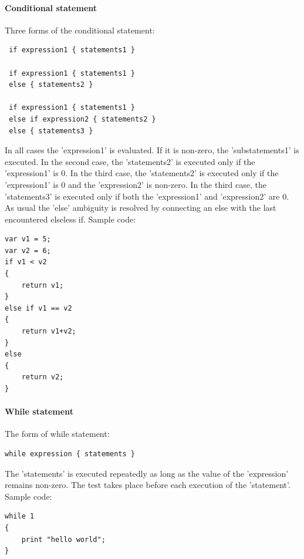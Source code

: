 \documentclass[12pt]{article} %
\begin{document}
\paragraph{Conditional statement}
Three forms of the conditional statement:
\begin{lstlisting}
 if expression1 { statements1 }

 if expression1 { statements1 } 
 else { statements2 }

 if expression1 { statements1 } 
 else if expression2 { statements2 }
 else { statements3 }
\end{lstlisting}
\noindent In all cases the 'expression1' is evaluated.  If it is non-zero, the  'substatements1' is executed. In the second case, the 'statements2' is executed only if the 'expression1' is 0. In the third case, the 'statements2' is executed only if the   'expression1' is 0 and the  'expression2' is non-zero.  In the third case, the 'statements3' is executed only if both the 'expression1' and 'expression2' are 0. As usual the 'else' ambiguity is resolved by connecting an else with the last encountered elseless if.  Sample code:

\begin{lstlisting}
var v1 = 5;
var v2 = 6;
if v1 < v2
{
	return v1;
}	
else if v1 == v2
{
	return v1+v2;
}
else
{
	return v2;
}
\end{lstlisting}


\paragraph{While statement}
The form of while statement:
\begin{lstlisting}
while expression { statements }
\end{lstlisting}
\noindent The  'statements' is executed repeatedly as long as the value of the 'expression' remains non-zero. The test takes place before each execution of the 'statement'. Sample code:

\begin{lstlisting}
while 1
{
	print "hello world";
}
\end{lstlisting}
\end{document}
